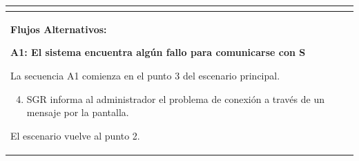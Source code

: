 \begin{longtable}{|l|p{5.5cm}|l|p{2cm}|l|p{1.9cm}|}
{					} \\ \hline

					\multicolumn{6}{|p{15cm}|}{ \textbf{Flujos Alternativos: }
					
					\textbf{A1: El sistema encuentra algún fallo para comunicarse con S}
					
					La secuencia A1 comienza en el punto 3 del escenario principal.
					\begin{enumerate}
							\setcounter{enumi}{3}
							\item SGR informa al administrador el problema de conexión a través de un mensaje por la pantalla.
					\end{enumerate}

					El escenario vuelve al punto 2.

					} \\ \hline

			\end{longtable}

